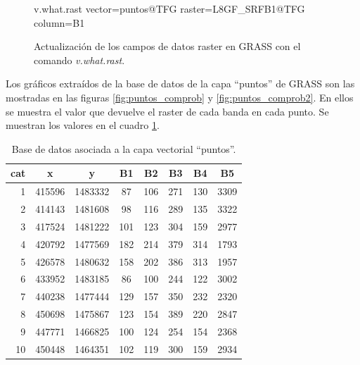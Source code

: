 \begin{figure}[ht]
\centering
\begin{boxedverbatim}
	v.what.rast vector=puntos@TFG raster=L8GF_SRFB1@TFG column=B1
\end{boxedverbatim}
\caption[Actualización de los datos raster]{Actualización de los campos de datos raster en GRASS con el comando \textit{v.what.rast}.}
\label{fig:v.what.rast}
\end{figure}

Los gráficos extraídos de la base de datos de la capa ``puntos'' de GRASS son las mostradas en las figuras \ref{fig:puntos_comprob} y \ref{fig:puntos_comprob2}. En ellos se muestra el valor que devuelve el raster de cada banda en cada punto. Se muestran los valores en el cuadro \ref{tab:tabla_puntos}.\Sep

\begin{table}[ht]
	\centering
	\caption[Base de datos de puntos de comprobación]{Base de datos asociada a la capa vectorial ``puntos''.}
	\begin{tabular}{@{}rccccccc@{}}
	\toprule[0.4mm]
	cat & x & y & B1 & B2 & B3 & B4 & B5\\
	\midrule
	1 & 415596 & 1483332 & 87 & 106 & 271 & 130 & 3309\\
	2 & 414143 & 1481608 & 98 & 116 & 289 & 135 & 3322\\
	3 & 417524 & 1481222 & 101 & 123 & 304 & 159 & 2977\\
	4 & 420792 & 1477569 & 182 & 214 & 379 & 314 & 1793\\
	5 & 426578 & 1480632 & 158 & 202 & 386 & 313 & 1957\\
	6 & 433952 & 1483185 & 86 & 100 & 244 & 122 & 3002\\
	7 & 440238 & 1477444 & 129 & 157 & 350 & 232 & 2320\\
	8 & 450698 & 1475867 & 123 & 154 & 389 & 220 & 2847\\
	9 & 447771 & 1466825 & 100 & 124 & 254 & 154 & 2368\\
	10 & 450448 & 1464351 & 102 & 119 & 300 & 159 & 2934\\
	\bottomrule[0.4mm]
	\end{tabular}
	\label{tab:tabla_puntos}
\end{table}


